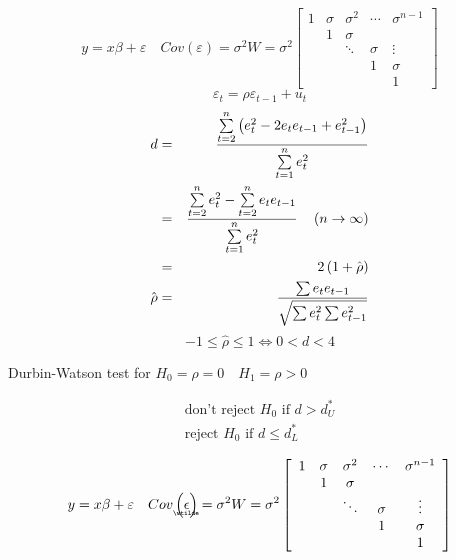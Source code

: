 \documentclass{article}
\begin{document}
\begin{equation*}
y=x\beta +\varepsilon \quad Cov\left( \varepsilon \right) =\sigma
^{2}W=\sigma ^{2}\left[ 
\begin{array}{ccccc}
1 & \sigma & \sigma ^{2} & \cdots & \sigma ^{n-1} \\ 
& 1 & \sigma &  &  \\ 
&  & \ddots & \sigma & \vdots \\ 
&  &  & 1 & \sigma \\ 
&  &  &  & 1%
\end{array}%
\right]
\end{equation*}%
\begin{equation*}
\varepsilon _{t}=\rho \varepsilon _{t-1}+u_{t}
\end{equation*}%
\begin{eqnarray*}
d &=&\frac{\tsum\limits_{t=2}^{n}\left(
e_{t}^{2}-2e_{t}e_{t-1}+e_{t-1}^{2}\right) }{\tsum\limits_{t=1}^{n}e_{t}^{2}}
\\
&=&\frac{\tsum\limits_{t=2}^{n}e_{t}^{2}-\tsum\limits_{t=2}^{n}e_{t}e_{t-1}}{%
\tsum\limits_{t=1}^{n}e_{t}^{2}}\quad \left( n\rightarrow \infty \right) \\
&=&2\left( 1+\hat{\rho}\right) \\
\hat{\rho} &=&\frac{\tsum e_{t}e_{t-1}}{\sqrt{\sum e_{t}^{2}\sum e_{t-1}^{2}}%
}
\end{eqnarray*}%
\begin{equation*}
-1\leq \hat{\rho}\leq 1\Leftrightarrow 0<d<4
\end{equation*}

\bigskip

Durbin-Watson test for $H_{0}=\rho =0\quad H_{1}=\rho >0$

\begin{flushright}
\begin{equation*}
\begin{array}{c}
\text{don't reject }H_{0}\text{ if }d>d_{U}^{\ast } \\ 
\text{reject }H_{0}\text{ if }d\leq d_{L}^{\ast }%
\end{array}%
\end{equation*}
\end{flushright}

\begin{equation*}
y=x\beta +\varepsilon \quad Cov\left( 
\underaccent{\wtilde}{\epsilon}%
\right) =\sigma ^{2}W=\sigma ^{2}\left[ 
\begin{array}{ccccc}
1 & \sigma & \sigma ^{2} & \cdots & \sigma ^{n-1} \\ 
& 1 & \sigma &  &  \\ 
&  & \ddots & \sigma & \vdots \\ 
&  &  & 1 & \sigma \\ 
&  &  &  & 1%
\end{array}%
\right]
\end{equation*}
\end{document}
